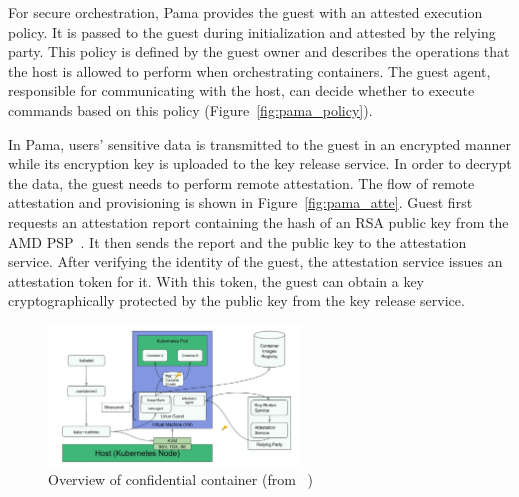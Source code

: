 For secure orchestration, Pama provides the guest with an attested execution policy. It is passed to the guest during initialization and attested by the relying party. This policy is defined by the guest owner and describes the operations that the host is allowed to perform when orchestrating 
containers. The guest agent, responsible for communicating with the host, can decide whether to execute commands based on this policy (Figure~\ref{fig:pama_policy}).  


In Pama, users' sensitive data is transmitted to the guest in an encrypted manner while its encryption key is uploaded to the key release service. In order to decrypt the data, the guest needs to perform remote attestation. The flow of remote attestation and provisioning 
is shown in Figure~\ref{fig:pama_atte}. Guest first requests an attestation report containing the hash of an RSA public key from the AMD PSP~\cite*{snp_firmware}. It then sends the report and the public key to the attestation service. After verifying the identity of the guest, 
the attestation service issues an attestation token for it. With this token, the guest can obtain a key cryptographically protected by the public key from the key release service.

 
\begin{figure}[htp]
    \centering
    \includegraphics[width=0.6\textwidth]{images/confidentail_kata.png}
    \caption[Overview of confidential container]{Overview of confidential container (from ~\cite*{confidential_kata})}
    \label{fig:confidentail_kata}
\end{figure}

